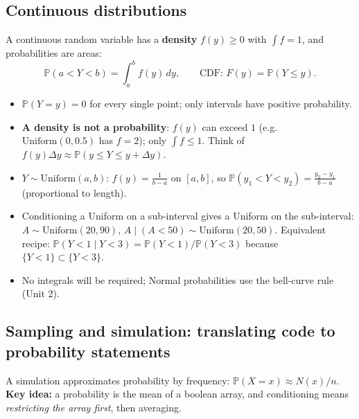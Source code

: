 \documentclass[11pt]{article}
\renewcommand{\P}{\mathbb{P}}
\newcommand{\given}{\mid}
\newcommand{\Unif}{\text{Uniform}}
\begin{document}
\subsection{Continuous distributions}
A continuous random variable has a \textbf{density} $f(y)\ge0$ with $\int f=1$, and probabilities are areas:
\[
\P(a<Y<b)=\int_a^b f(y)\,dy,\qquad \text{CDF: } F(y)=\P(Y\le y).
\]
\begin{itemize}[leftmargin=*,itemsep=2pt]
  \item $\P(Y=y)=0$ for every single point; only intervals have positive probability.
  \item \textbf{A density is not a probability}: $f(y)$ can exceed $1$ (e.g.\ $\Unif(0,0.5)$ has $f=2$); only $\int f\le 1$. Think of $f(y)\Delta y\approx\P(y\le Y\le y+\Delta y)$.
  \item $Y\sim\Unif(a,b)$: $f(y)=\frac1{b-a}$ on $[a,b]$, so $\P(y_1<Y<y_2)=\frac{y_2-y_1}{b-a}$ (proportional to length).
  \item Conditioning a Uniform on a sub-interval gives a Uniform on the sub-interval: $A\sim\Unif(20,90)$, $A\given(A<50)\sim\Unif(20,50)$.
  Equivalent recipe: $\P(Y<1\given Y<3)=\P(Y<1)/\P(Y<3)$ because $\{Y<1\}\subset\{Y<3\}$.
  \item No integrals will be required; Normal probabilities use the bell-curve rule (Unit 2).
\end{itemize}

\subsection{Sampling and simulation: translating code to probability statements}
A simulation approximates probability by frequency: $\P(X=x)\approx N(x)/n$. \textbf{Key idea:} a probability is the mean of a boolean array,
and conditioning means \emph{restricting the array first}, then averaging.
\end{document}
